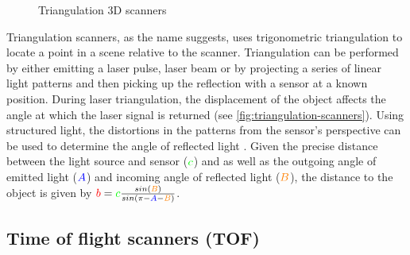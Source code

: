 \begin{figure}[H]
\begin{subfigure}[b]{.33\textwidth}
		\caption{}
	\end{subfigure}
	\caption{Triangulation 3D scanners \protect\footnotemark}
	\label{fig:triangulation-scanners}
\end{figure}

Triangulation scanners, as the name suggests, uses trigonometric triangulation \cite{Frohlich2004} to locate a point in a scene relative to the scanner. Triangulation can be performed by either emitting a laser pulse, laser beam or by projecting a series of linear light patterns and then picking up the reflection with a sensor at a known position. During laser triangulation, the displacement of the object affects the angle at which the laser signal is returned (see \autoref{fig:triangulation-scanners}). Using structured light, the distortions in the patterns from the sensor's perspective can be used to determine the angle of reflected light \cite{Brown2012}. Given the precise distance between the light source and sensor ($\begingroup\color{green}c\endgroup$) and as well as the outgoing angle of emitted light ($\begingroup\color{blue}A\endgroup$) and incoming angle of reflected light ($\begingroup\color{orange}B\endgroup$), the distance to the object is given by $\begingroup\color{red}b\endgroup = \begingroup\color{green}c\endgroup\frac{ sin(\begingroup\color{orange}B\endgroup)}{sin(\pi - \begingroup\color{blue}A\endgroup-\begingroup\color{orange}B\endgroup)}$.

\subsection{Time of flight scanners (TOF)} \label{subsec:tof}

